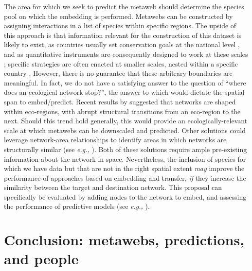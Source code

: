 The area for which we seek to predict the metaweb should determine the
species pool on which the embedding is performed. Metawebs can be
constructed by assigning interactions in a list of species within
specific regions. The upside of this approach is that information
relevant for the construction of this dataset is likely to exist, as
countries usually set conservation goals at the national level
\cite{Buxton2021Key}, and as quantitative instruments are consequently
designed to work at these scales \cite{Turak2017Using}; specific
strategies are often enacted at smaller scales, nested within a specific
country \cite{Ray2021Biodiversity}. However, there is no guarantee that
these arbitrary boundaries are meaningful. In fact, we do not have a
satisfying answer to the question of ``where does an ecological network
stop?'', the answer to which would dictate the spatial span to
embed/predict. Recent results by \cite{Martins2022Global} suggested that
networks are shaped within eco-regions, with abrupt structural
transitions from an eco-region to the next. Should this trend hold
generally, this would provide an ecologically-relevant scale at which
metawebs can be downscaled and predicted. Other solutions could leverage
network-area relationships to identify areas in which networks are
structurally similar (see \emph{e.g.,} \cite{Fortin2021Network,
Galiana2018Spatial, Galiana2022Ecological}). Both of these solutions
require ample pre-existing information about the network in space.
Nevertheless, the inclusion of species for which we have data but that
are not in the right spatial extent \emph{may} improve the performance
of approaches based on embedding and transfer, \emph{if} they increase
the similarity between the target and destination network. This proposal
can specifically be evaluated by adding nodes to the network to embed,
and assessing the performance of predictive models (see \emph{e.g.,}
\cite{Llewelyn2022Predicting}).

\section{Conclusion: metawebs, predictions, and
people}\label{conclusion-metawebs-predictions-and-people}

